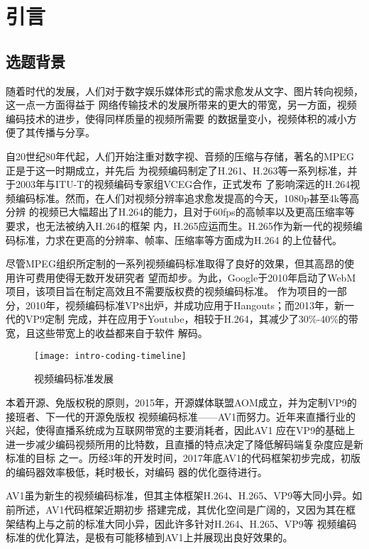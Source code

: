 \chapter{引言}
\label{cha:intro}

\section{选题背景}
\label{sec:background}

随着时代的发展，人们对于数字娱乐媒体形式的需求愈发从文字、图片转向视频，这一点一方面得益于
网络传输技术的发展所带来的更大的带宽，另一方面，视频编码技术的进步，使得同样质量的视频所需要
的数据量变小，视频体积的减小方便了其传播与分享。

自20世纪80年代起，人们开始注重对数字视、音频的压缩与存储，著名的MPEG正是于这一时期成立，并先后
为视频编码制定了H.261、H.263等一系列标准，并于2003年与ITU-T的视频编码专家组VCEG合作，正式发布
了影响深远的H.264视频编码标准。然而，在人们对视频分辨率追求愈发提高的今天，1080p甚至4k等高分辨
的视频已大幅超出了H.264的能力，且对于60fps的高帧率以及更高压缩率等要求，也无法被纳入H.264的框架
内，H.265应运而生。H.265作为新一代的视频编码标准，力求在更高的分辨率、帧率、压缩率等方面成为H.264
的上位替代。

尽管MPEG组织所定制的一系列视频编码标准取得了良好的效果，但其高昂的使用许可费用使得无数开发研究者
望而却步。为此，Google于2010年启动了WebM项目，该项目旨在制定高效且不需要版权费的视频编码标准。
作为项目的一部分，2010年，视频编码标准VP8出炉，并成功应用于Hangouts；而2013年，新一代的VP9定制
完成，并在应用于Youtube，相较于H.264，其减少了30\%-40\%的带宽，且这些带宽上的收益都来自于软件
解码。

\begin{figure}[H] %
  \centering
  \texttt{[image: intro-coding-timeline]}
  \caption{视频编码标准发展}
\end{figure}

本着开源、免版权税的原则，2015年，开源媒体联盟AOM成立，并为定制VP9的接班者、下一代的开源免版权
视频编码标准——AV1而努力。近年来直播行业的兴起，使得直播系统成为互联网带宽的主要消耗者，因此AV1
应在VP9的基础上进一步减少编码视频所用的比特数，且直播的特点决定了降低解码端复杂度应是新标准的目标
之一。历经3年的开发时间，2017年底AV1的代码框架初步完成，初版的编码器效率极低，耗时极长，对编码
器的优化亟待进行。

AV1虽为新生的视频编码标准，但其主体框架H.264、H.265、VP9等大同小异。如前所述，AV1代码框架近期初步
搭建完成，其优化空间是广阔的，又因为其在框架结构上与之前的标准大同小异，因此许多针对H.264、H.265、VP9等
视频编码标准的优化算法，是极有可能移植到AV1上并展现出良好效果的。

